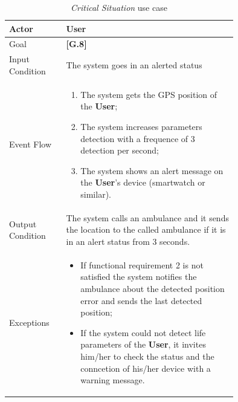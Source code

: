 \begin{center}
\begin{table}[H]
\begin{tabular}{ | l | p{0.75\linewidth} | }
  \hline
    Actor & \textbf{User} \\ \hline
    Goal & \textbf{[G.8]} \\ \hline
    Input Condition & The system goes in an alerted status \\ \hline
    Event Flow & \begin{minipage}[t]{0.7\textwidth}
      \begin{enumerate}
        \item The system gets the GPS position of the \textbf{User};
        \item The system increases parameters detection with a frequence of 3 detection per second;
        \item The system shows an alert message on the \textbf{User}'s device (smartwatch or similar).
      \end{enumerate}
    \smallskip
  \end{minipage} \\ \hline
  Output Condition & The system calls an ambulance and it sends the location to the called ambulance if it is in an alert status from 3 seconds. \\ \hline
  Exceptions & \begin{minipage}[t]{0.7\textwidth}
    \begin{itemize}
      \smallskip
      \item If functional requirement 2 is not satisfied the system notifies the ambulance about the detected position error and sends the last detected position;
      \item If the system could not detect life parameters of the \textbf{User}, it invites him/her to check the status and the conncetion of his/her device with a warning message.
    \end{itemize}
    \smallskip
  \end{minipage}  \\ \hline
\end{tabular}
\caption{\textit{Critical Situation} use case}
\label{table:criticalSituationTable}
\end{table}
\end{center}

